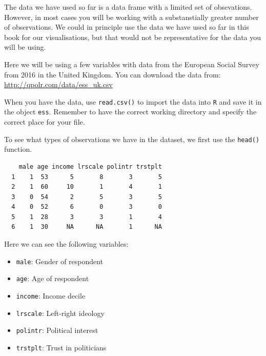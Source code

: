 \documentclass[12pt,oneside]{reedthesis}
\providecommand{\tightlist}{%
  \setlength{\itemsep}{0pt}\setlength{\parskip}{0pt}}
\theoremstyle{definition}
\theoremstyle{definition}
\theoremstyle{definition}
\theoremstyle{remark}
\begin{document}
  The data we have used so far is a data frame with a limited set of
  obsevations. However, in most cases you will be working with a
  substanstially greater number of observations. We could in principle use
  the data we have used so far in this book for our visualisations, but
  that would not be representative for the data you will be using.
  
  Here we will be using a few variables with data from the European Social
  Survey from 2016 in the United Kingdom. You can download the data from:
  \url{http://qpolr.com/data/ess_uk.csv}
  
  When you have the data, use \texttt{read.csv()} to import the data into
  \texttt{R} and save it in the object \texttt{ess}. Remember to have the
  correct working directory and specify the correct place for your file.
  \begin{Shaded}
  \begin{Highlighting}[]
  \StringTok{ }\NormalTok{(}\NormalTok{)}
  \end{Highlighting}
  \end{Shaded}
  To see what types of observations we have in the dataset, we first use
  the \texttt{head()} function.
  \begin{Shaded}
  \begin{Highlighting}[]
  \end{Highlighting}
  \end{Shaded}
  \begin{verbatim}
    male age income lrscale polintr trstplt
  1    1  53      5       8       3       5
  2    1  60     10       1       4       1
  3    0  54      2       5       3       5
  4    0  52      6       0       3       0
  5    1  28      3       3       1       4
  6    1  30     NA      NA       1      NA
  \end{verbatim}
  Here we can see the following variables:
  \begin{itemize}
  \tightlist
  \item
    \texttt{male}: Gender of respondent
  \item
    \texttt{age}: Age of respondent
  \item
    \texttt{income}: Income decile
  \item
    \texttt{lrscale}: Left-right ideology
  \item
    \texttt{polintr}: Political interest
  \item
    \texttt{trstplt}: Trust in politicians
  \end{itemize}
\end{document}
